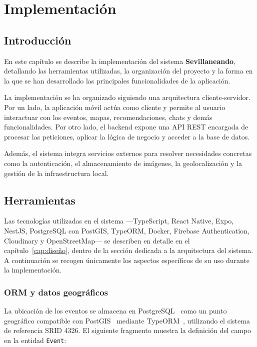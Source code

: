 \chapter{Implementación}\label{cap:implementacion}

\section{Introducción}

En este capítulo se describe la implementación del sistema \textbf{Sevillaneando}, detallando las herramientas utilizadas, la organización del proyecto y la forma en la que se han desarrollado las principales funcionalidades de la aplicación.

La implementación se ha organizado siguiendo una arquitectura cliente-servidor. Por un lado, la aplicación móvil actúa como cliente y permite al usuario interactuar con los eventos, mapas, recomendaciones, chats y demás funcionalidades. Por otro lado, el backend expone una API REST encargada de procesar las peticiones, aplicar la lógica de negocio y acceder a la base de datos.

Además, el sistema integra servicios externos para resolver necesidades concretas como la autenticación, el almacenamiento de imágenes, la geolocalización y la gestión de la infraestructura local.

\section{Herramientas}

Las tecnologías utilizadas en el sistema —TypeScript, React Native, Expo, NestJS, PostgreSQL con PostGIS, TypeORM, Docker, Firebase Authentication, Cloudinary y OpenStreetMap— se describen en detalle en el capítulo~\ref{cap:diseño}, dentro de la sección dedicada a la arquitectura del sistema. A continuación se recogen únicamente los aspectos específicos de su uso durante la implementación.

\subsection{ORM y datos geográficos}

La ubicación de los eventos se almacena en PostgreSQL~\cite{postgresql} como un punto geográfico compatible con PostGIS~\cite{postgisdocs} mediante TypeORM~\cite{typeorm}, utilizando el sistema de referencia SRID 4326. El siguiente fragmento muestra la definición del campo en la entidad \texttt{Event}:

